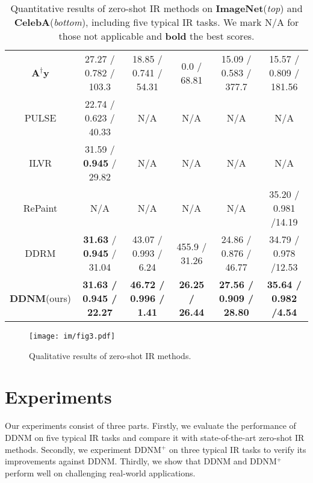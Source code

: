 \documentclass{article} \usepackage{iclr2023_conference,times}
\begin{document}
\begin{table*}[t]
\begin{tabular}{cccccc}
        \hline
            \rule{0pt}{10pt}{$\mathbf{A}^{\dagger}\mathbf{y}$} &27.27 / 0.782 / 103.3 &18.85 / 0.741 / 54.31
            &0.0 / 68.81&15.09 / 0.583 / 377.7& 15.57 / 0.809 / 181.56\\
            \rule{0pt}{10pt}{PULSE} &22.74 / 0.623 / 40.33&{N/A}& {N/A}& {N/A}& {N/A}\\
            \rule{0pt}{10pt}{ILVR} &31.59 / \textbf{0.945} / 29.82 &{N/A}& {N/A}& {N/A}& {N/A}\\
            \rule{0pt}{10pt}{RePaint} &{N/A}&{N/A}& {N/A}& {N/A}&35.20 / 0.981 /14.19\\
            \rule{0pt}{10pt}{DDRM} &\textbf{31.63} / \textbf{0.945} / 31.04&43.07 / 0.993 / 6.24
            &455.9 / 31.26&24.86 / 0.876 / 46.77&34.79 / 0.978 /12.53\\
            \rule{0pt}{10pt}{\textbf{DDNM}(ours)} &\textbf{31.63 / 0.945 / 22.27}&\textbf{46.72 / 0.996 / 1.41}   &\textbf{26.25 / 26.44}&\textbf{27.56 / 0.909 / 28.80}&\textbf{35.64 / 0.982 /4.54}\\
        \hline
    \end{tabular}
    \caption{Quantitative results of zero-shot IR methods on \textbf{ImageNet}(\textit{top}) and \textbf{CelebA}(\textit{bottom}), including five typical IR tasks. We mark N/A for those not applicable and \textbf{bold} the best scores.}
    \label{tb:ndm}
\end{table*}

\begin{figure*}[t]
  \centering
\texttt{[image: im/fig3.pdf]}
  \vspace{-0.4cm}
  \caption{Qualitative results of zero-shot IR methods. }
  \vspace{-0.1cm}
\label{fig:ndm+ comprehensive} 
\end{figure*}


\section{Experiments}
Our experiments consist of three parts. Firstly, we evaluate the performance of DDNM on five typical IR tasks and compare it with state-of-the-art zero-shot IR methods. Secondly, we experiment DDNM$^+$ on three typical IR tasks to verify its improvements against DDNM. Thirdly, we show that DDNM and DDNM$^+$ perform well on challenging real-world applications.
\end{document}

